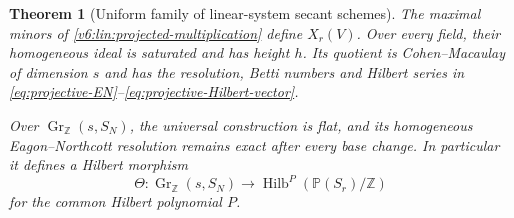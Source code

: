\documentclass[10pt,fleqn]{article}
\numberwithin{equation}{section}
\newtheorem{theorem}{Theorem}[section]
\newcommand{\PP}{\mathbb P}
\begin{document}
\begin{theorem}[Uniform family of linear-system secant schemes]
\label{v6:lin:uniform}
The maximal minors of \eqref{v6:lin:projected-multiplication} define
$X_r(V)$.  Over every field, their homogeneous ideal is saturated and
has height $h$.  Its quotient is Cohen--Macaulay of dimension $s$ and
has the resolution, Betti numbers and Hilbert series in
\eqref{eq:projective-EN}--\eqref{eq:projective-Hilbert-vector}.

Over $\operatorname{Gr}_{\mathbb Z}(s,S_N)$, the universal construction
is flat, and its homogeneous Eagon--Northcott resolution remains exact
after every base change.  In particular it defines a Hilbert morphism
\begin{equation}\label{v6:lin:hilbert-map}
 \Theta:\operatorname{Gr}_{\mathbb Z}(s,S_N)
 \longrightarrow\operatorname{Hilb}^{P}(\PP(S_r)/\mathbb Z)
\end{equation}
for the common Hilbert polynomial $P$.
\end{theorem}
\end{document}
